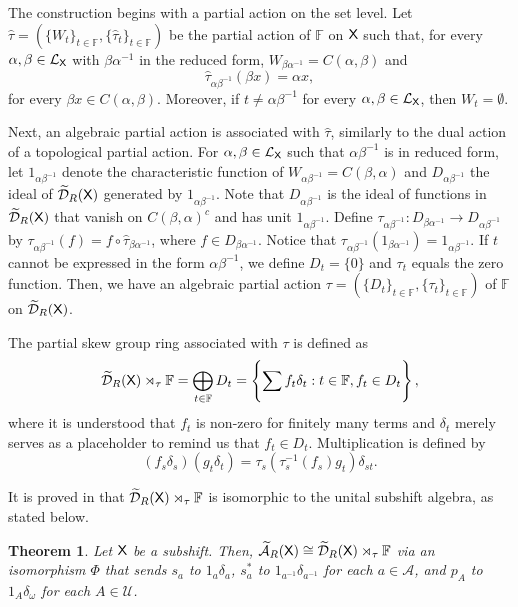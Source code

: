 \documentclass[a4paper,12pt]{amsart}
\newtheorem{theorem}[equation]{Theorem}
\theoremstyle{definition}
\theoremstyle{remark}
\numberwithin{equation}{section}
\newcommand{\osf}{{\normalfont \textsf{X}}}
\newcommand{\lang}{\CL_{\osf}}
\newcommand{\ualgshift}{\TCA_R(\osf)}
\newcommand{\udalgshift}{\TCD_R(\osf)}
\newcommand{\alf}{\mathscr{A}}
\newcommand{\F}{\mathbb{F}}
\newcommand{\CA}{\mathcal{A}}
\newcommand{\CD}{\mathcal{D}}
\newcommand{\CL}{\mathcal{L}}
\newcommand{\TCA}{\widetilde{\CA}}
\newcommand{\TCD}{\widetilde{\CD}}
\newcommand{\tauh}{\widehat{\tau}}
\newcommand{\eword}{\omega}
\begin{document}
The construction begins with a partial action on the set level. Let $\tauh=\left(\{W_t\}_{t\in\F},\{\tauh_t\}_{t\in\F}  \right)$ be the partial action of $\F$ on $\osf$ such that, for every $\alpha,\beta\in\lang$ with $\beta\alpha^{-1}$ in the reduced form, $W_{\beta\alpha^{-1}} = C(\alpha,\beta)$ and
\[\tauh_{\alpha\beta^{-1}}(\beta x)=\alpha x,\]
for every $\beta x\in C(\alpha,\beta)$. Moreover, if $t\neq \alpha\beta^{-1}$ for every $\alpha,\beta\in\lang$, then $W_t=\emptyset$.

Next, an algebraic partial action is associated with $\tauh$, similarly to the dual action of a topological partial action. For $\alpha,\beta\in \lang$ such that $\alpha\beta^{-1}$ is in reduced form, let $1_{\alpha\beta^{-1}}$ denote the characteristic function of $W_{\alpha\beta^{-1}}=C(\beta,\alpha)$ and $D_{\alpha\beta^{-1}}$ the ideal of $\udalgshift$ generated by $1_{\alpha\beta^{-1}}$. Note that $D_{\alpha\beta^{-1}}$ is the ideal of functions in $\udalgshift$ that vanish on $C(\beta,\alpha)^c$ and has unit $1_{\alpha\beta^{-1}}$. Define $\tau_{\alpha\beta^{-1}}:D_{\beta\alpha^{-1}}\to D_{\alpha\beta^{-1}}$ by $\tau_{\alpha\beta^{-1}}(f)=f\circ\tauh_{\beta\alpha^{-1}}$, where $f\in D_{\beta\alpha^{-1}}$. Notice that $\tau_{\alpha\beta^{ -1}}(1_{\beta\alpha^{-1}})=1_{\alpha\beta^{-1}}$. If $t$ cannot be expressed in the form $\alpha\beta^{-1}$, we define $D_t=\{0\}$ and $\tau_t$ equals the zero function. Then, we have an algebraic partial action $\tau=\left( \{D_t\}_{t\in \F}, \{\tau_t\}_{t\in\F} \right)$  of $\F$ on $\udalgshift$.

The partial skew group ring associated with $\tau$ is defined as 
\[\udalgshift\rtimes_{\tau}\F= \bigoplus_{t\in\F} D_t=\left\{\sum_{} f_t\delta_t: t\in \F, f_t\in D_t \right\}, \]
where it is understood that $f_t$ is non-zero for finitely many terms and $\delta_t$ merely serves as a placeholder to remind us that $f_t\in D_t$. Multiplication is defined by 
\begin{equation}\label{eq:partial_multiplication}
    (f_s\delta_s)(g_t\delta_t) = \tau_s(\tau_s^{-1}(f_s)g_t )\delta_{st}.
\end{equation}

It is proved in \cite[Theorem 5.9]{BGGV} that $\udalgshift\rtimes_{\tau}\F$ is isomorphic to the unital subshift algebra, as stated below. 

\begin{theorem}\label{thm:set-theoretic-partial-action}
Let $\osf$ be a subshift. Then, $\ualgshift\cong\udalgshift\rtimes_{\tau}\F$ via an isomorphism $\Phi$ that sends $s_a$ to $1_a\delta_a$, $s^*_a$ to $1_{a^{-1}}\delta_{a^{-1}}$ for each $a \in \alf$, and $p_A$ to $1_A \delta_{\eword}$ for each $A\in \mathcal{U}$.
\end{theorem}
\end{document}
